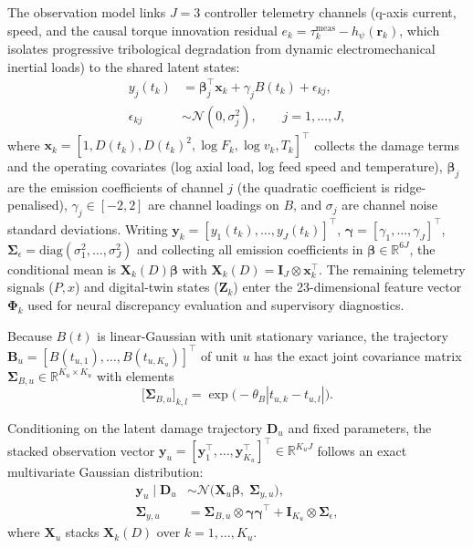 \documentclass[a4paper,fleqn]{cas-dc}
\newcommand{\bPhi}{\bm{\Phi}}
\newcommand{\R}{\mathbb{R}}
\begin{document}
The observation model links $J = 3$ controller telemetry channels (q-axis current, speed, and the causal torque innovation residual $e_k = \tau_k^{\mathrm{meas}} - h_\psi(\mathbf{r}_k)$, which isolates progressive tribological degradation from dynamic electromechanical inertial loads) to the shared latent states:
\begin{equation}
\begin{aligned}
    y_j(t_k) &= \boldsymbol{\beta}_j^\top \mathbf{x}_k + \gamma_j B(t_k) + \epsilon_{kj},\\
    \epsilon_{kj} &\sim \mathcal{N}(0, \sigma_j^2), \qquad j = 1, \dots, J,
\end{aligned}
    \label{eq:observation_model}
\end{equation}
where $\mathbf{x}_k = [1, D(t_k), D(t_k)^2, \log F_k, \log v_k, T_k]^\top$ collects the damage terms and the operating covariates (log axial load, log feed speed and temperature), $\boldsymbol{\beta}_j$ are the emission coefficients of channel $j$ (the quadratic coefficient is ridge-penalised), $\gamma_j \in [-2, 2]$ are channel loadings on $B$, and $\sigma_j$ are channel noise standard deviations. Writing $\mathbf{y}_k = [y_1(t_k), \dots, y_J(t_k)]^\top$, $\boldsymbol{\gamma} = [\gamma_1, \dots, \gamma_J]^\top$, $\boldsymbol{\Sigma}_\epsilon = \mathrm{diag}(\sigma_1^2, \dots, \sigma_J^2)$ and collecting all emission coefficients in $\boldsymbol{\beta} \in \R^{6J}$, the conditional mean is $\mathbf{X}_k(D)\boldsymbol{\beta}$ with $\mathbf{X}_k(D) = \mathbf{I}_J \otimes \mathbf{x}_k^\top$. The remaining telemetry signals ($P, x$) and digital-twin states ($\mathbf{Z}_k$) enter the 23-dimensional feature vector $\bPhi_k$ used for neural discrepancy evaluation and supervisory diagnostics.

Because $B(t)$ is linear-Gaussian with unit stationary variance, the trajectory $\mathbf{B}_u = [B(t_{u,1}), \dots, B(t_{u,K_u})]^\top$ of unit $u$ has the exact joint covariance matrix $\boldsymbol{\Sigma}_{B,u} \in \R^{K_u \times K_u}$ with elements
\begin{equation}
    \bigl[\boldsymbol{\Sigma}_{B,u}\bigr]_{k,l} = \exp\bigl(-\theta_B |t_{u,k} - t_{u,l}|\bigr).
    \label{eq:sigma_b}
\end{equation}

Conditioning on the latent damage trajectory $\mathbf{D}_u$ and fixed parameters, the stacked observation vector $\mathbf{y}_u = [\mathbf{y}_1^\top, \dots, \mathbf{y}_{K_u}^\top]^\top \in \R^{K_u J}$ follows an exact multivariate Gaussian distribution:
\begin{equation}
\begin{aligned}
    \mathbf{y}_u \mid \mathbf{D}_u &\sim \mathcal{N}\bigl(\mathbf{X}_u \boldsymbol{\beta}, \; \boldsymbol{\Sigma}_{y,u}\bigr),\\
    \boldsymbol{\Sigma}_{y,u} &= \boldsymbol{\Sigma}_{B,u} \otimes \boldsymbol{\gamma}\boldsymbol{\gamma}^\top + \mathbf{I}_{K_u} \otimes \boldsymbol{\Sigma}_\epsilon,
\end{aligned}
    \label{eq:marginal_gaussian}
\end{equation}
where $\mathbf{X}_u$ stacks $\mathbf{X}_k(D)$ over $k = 1, \dots, K_u$.
\end{document}
